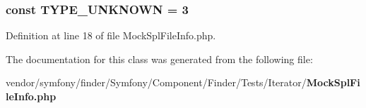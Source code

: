 \subsubsection[{T\+Y\+P\+E\+\_\+\+U\+N\+K\+N\+O\+W\+N}]{\setlength{\rightskip}{0pt plus 5cm}const T\+Y\+P\+E\+\_\+\+U\+N\+K\+N\+O\+W\+N = 3}\label{class_symfony_1_1_component_1_1_finder_1_1_tests_1_1_iterator_1_1_mock_spl_file_info_a885836afba10978cc767bc02a3da70ea}


Definition at line 18 of file Mock\+Spl\+File\+Info.\+php.



The documentation for this class was generated from the following file\+:\begin{DoxyCompactItemize}
\item 
vendor/symfony/finder/\+Symfony/\+Component/\+Finder/\+Tests/\+Iterator/{\bf Mock\+Spl\+File\+Info.\+php}\end{DoxyCompactItemize}
